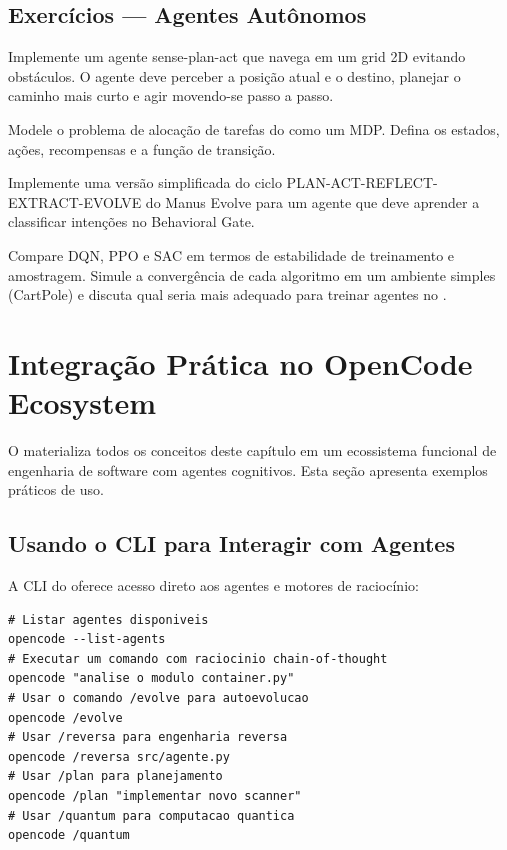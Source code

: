 \subsection{Exercícios — Agentes Autônomos}
\begin{exercicio}
Implemente um agente sense-plan-act que navega em um grid 2D evitando
obstáculos. O agente deve perceber a posição atual e o destino, planejar
o caminho mais curto e agir movendo-se passo a passo.
\end{exercicio}
\begin{exercicio}
Modele o problema de alocação de tarefas do \opencodeeco{} como um MDP.
Defina os estados, ações, recompensas e a função de transição.
\end{exercicio}
\begin{exercicio}
Implemente uma versão simplificada do ciclo PLAN-ACT-REFLECT-EXTRACT-EVOLVE
do Manus Evolve para um agente que deve aprender a classificar intenções
no Behavioral Gate.
\end{exercicio}
\begin{exercicio}
Compare DQN, PPO e SAC em termos de estabilidade de treinamento e
amostragem. Simule a convergência de cada algoritmo em um ambiente
simples (CartPole) e discuta qual seria mais adequado para treinar
agentes no \opencodeeco{}.
\end{exercicio}
\section{Integração Prática no OpenCode Ecosystem}
\label{sec:integração-pratica}
O \opencodeeco{} materializa todos os conceitos deste capítulo em um
ecossistema funcional de engenharia de software com agentes cognitivos.
Esta seção apresenta exemplos práticos de uso.
\subsection{Usando o CLI para Interagir com Agentes}
A CLI do \opencodeeco{} oferece acesso direto aos agentes e motores
de raciocínio:
\begin{lstlisting}[style=bashstyle]
# Listar agentes disponiveis
opencode --list-agents
# Executar um comando com raciocinio chain-of-thought
opencode "analise o modulo container.py"
# Usar o comando /evolve para autoevolucao
opencode /evolve
# Usar /reversa para engenharia reversa
opencode /reversa src/agente.py
# Usar /plan para planejamento
opencode /plan "implementar novo scanner"
# Usar /quantum para computacao quantica
opencode /quantum
\end{lstlisting}
